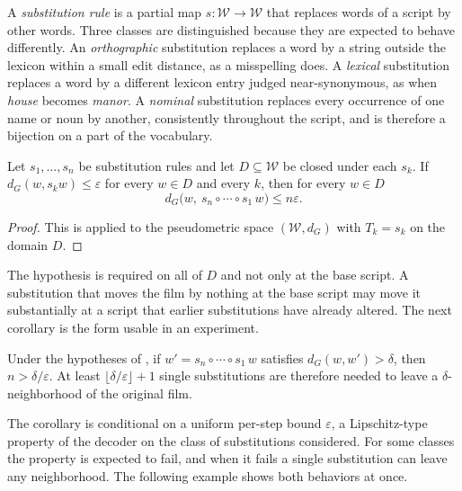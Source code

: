 A \emph{substitution rule} is a partial map $s:\mathcal{W}\to\mathcal{W}$ that replaces words of a script by other words. Three classes are distinguished because they are expected to behave differently. An \emph{orthographic} substitution replaces a word by a string outside the lexicon within a small edit distance, as a misspelling does. A \emph{lexical} substitution replaces a word by a different lexicon entry judged near-synonymous, as when \emph{house} becomes \emph{manor}. A \emph{nominal} substitution replaces every occurrence of one name or noun by another, consistently throughout the script, and is therefore a bijection on a part of the vocabulary.

\begin{proposition}\label{prop:subdrift}
Let $s_1,\dots,s_n$ be substitution rules and let $D\subseteq\mathcal{W}$ be closed under each $s_k$. If $d_G(w,s_kw)\le\varepsilon$ for every $w\in D$ and every $k$, then for every $w\in D$
\[
d_G\bigl(w,\ s_n\circ\cdots\circ s_1\,w\bigr)\le n\varepsilon .
\]
\end{proposition}

\begin{proof}
This is  applied to the pseudometric space $(\mathcal{W},d_G)$ with $T_k=s_k$ on the domain $D$.
\end{proof}

The hypothesis is required on all of $D$ and not only at the base script. A substitution that moves the film by nothing at the base script may move it substantially at a script that earlier substitutions have already altered. The next corollary is the form usable in an experiment.

\begin{corollary}\label{cor:subradius}
Under the hypotheses of , if $w'=s_n\circ\cdots\circ s_1\,w$ satisfies $d_G(w,w')>\delta$, then $n>\delta/\varepsilon$. At least $\lfloor\delta/\varepsilon\rfloor+1$ single substitutions are therefore needed to leave a $\delta$-neighborhood of the original film.
\end{corollary}

The corollary is conditional on a uniform per-step bound $\varepsilon$, a Lipschitz-type property of the decoder on the class of substitutions considered. For some classes the property is expected to fail, and when it fails a single substitution can leave any neighborhood. The following example shows both behaviors at once.

